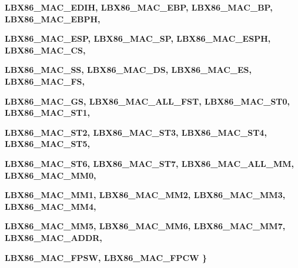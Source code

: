 \begin{CompactItemize}
\bf{LBX86\_\-MAC\_\-EDIH}, 
\bf{LBX86\_\-MAC\_\-EBP}, 
\bf{LBX86\_\-MAC\_\-BP}, 
\bf{LBX86\_\-MAC\_\-EBPH}, 
\par
\bf{LBX86\_\-MAC\_\-ESP}, 
\bf{LBX86\_\-MAC\_\-SP}, 
\bf{LBX86\_\-MAC\_\-ESPH}, 
\bf{LBX86\_\-MAC\_\-CS}, 
\par
\bf{LBX86\_\-MAC\_\-SS}, 
\bf{LBX86\_\-MAC\_\-DS}, 
\bf{LBX86\_\-MAC\_\-ES}, 
\bf{LBX86\_\-MAC\_\-FS}, 
\par
\bf{LBX86\_\-MAC\_\-GS}, 
\bf{LBX86\_\-MAC\_\-ALL\_\-FST}, 
\bf{LBX86\_\-MAC\_\-ST0}, 
\bf{LBX86\_\-MAC\_\-ST1}, 
\par
\bf{LBX86\_\-MAC\_\-ST2}, 
\bf{LBX86\_\-MAC\_\-ST3}, 
\bf{LBX86\_\-MAC\_\-ST4}, 
\bf{LBX86\_\-MAC\_\-ST5}, 
\par
\bf{LBX86\_\-MAC\_\-ST6}, 
\bf{LBX86\_\-MAC\_\-ST7}, 
\bf{LBX86\_\-MAC\_\-ALL\_\-MM}, 
\bf{LBX86\_\-MAC\_\-MM0}, 
\par
\bf{LBX86\_\-MAC\_\-MM1}, 
\bf{LBX86\_\-MAC\_\-MM2}, 
\bf{LBX86\_\-MAC\_\-MM3}, 
\bf{LBX86\_\-MAC\_\-MM4}, 
\par
\bf{LBX86\_\-MAC\_\-MM5}, 
\bf{LBX86\_\-MAC\_\-MM6}, 
\bf{LBX86\_\-MAC\_\-MM7}, 
\bf{LBX86\_\-MAC\_\-ADDR}, 
\par
\bf{LBX86\_\-MAC\_\-FPSW}, 
\bf{LBX86\_\-MAC\_\-FPCW}
 \}
\end{CompactItemize}
